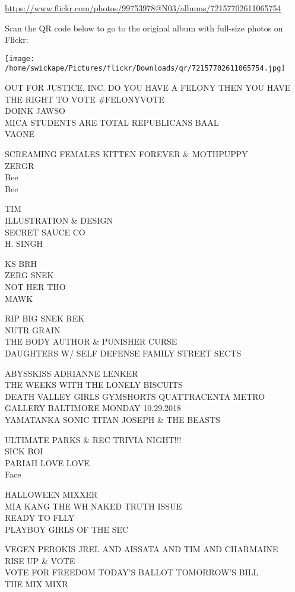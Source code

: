 \documentclass[10pt,letterpaper]{article}
\begin{document}
\url{https://www.flickr.com/photos/99753978@N03/albums/72157702611065754}

Scan the QR code below to go to the original album with full-size photos on Flickr:

\texttt{[image: /home/swickape/Pictures/flickr/Downloads/qr/72157702611065754.jpg]}


OUT FOR JUSTICE, INC. DO YOU HAVE A FELONY THEN YOU HAVE THE RIGHT TO VOTE \#FELONYVOTE\\
DOINK JAWSO\\
MICA STUDENTS ARE TOTAL REPUBLICANS BAAL\\
VAONE

SCREAMING FEMALES KITTEN FOREVER \& MOTHPUPPY\\
ZERGR\\
Bee\\
Bee

TIM\\
ILLUSTRATION \& DESIGN\\
SECRET SAUCE CO\\
H. SINGH

KS BRH\\
ZERG SNEK\\
NOT HER THO\\
MAWK

RIP BIG SNEK REK\\
NUTR GRAIN\\
THE BODY AUTHOR \& PUNISHER CURSE\\
DAUGHTERS W/ SELF DEFENSE FAMILY STREET SECTS

ABYSSKISS ADRIANNE LENKER\\
THE WEEKS WITH THE LONELY BISCUITS\\
DEATH VALLEY GIRLS GYMSHORTS QUATTRACENTA METRO GALLERY BALTIMORE MONDAY 10.29.2018\\
YAMATANKA SONIC TITAN JOSEPH \& THE BEASTS

ULTIMATE PARKS \& REC TRIVIA NIGHT!!!\\
SICK BOI\\
PARIAH LOVE LOVE\\
Face

HALLOWEEN MIXXER\\
MIA KANG THE WH NAKED TRUTH ISSUE\\
READY TO FLLY\\
PLAYBOY GIRLS OF THE SEC

VEGEN PEROKIS JREL AND AISSATA AND TIM AND CHARMAINE\\
RISE UP \& VOTE\\
VOTE FOR FREEDOM TODAY'S BALLOT TOMORROW'S BILL\\
THE MIX MIXR
\end{document}
